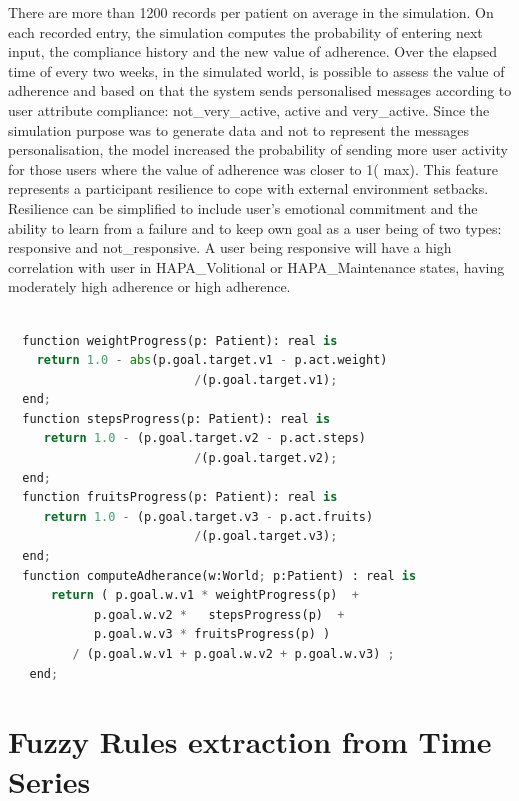 \documentclass[graybox]{svmult}
\begin{document}
There are more than 1200 records per patient on average in the simulation. On each recorded entry, the simulation computes the probability of entering next input, the compliance history and the new value of adherence. Over the elapsed time of every two weeks, in the simulated world,  is possible to assess the value of adherence and based on that the system sends personalised messages according to user attribute compliance: not\_very\_active, active and very\_active. Since the simulation purpose was to generate data and not to represent the messages personalisation, the model increased the probability of sending more user activity for those users where the value of adherence was closer to 1( max).  This feature represents a participant resilience to cope with external environment setbacks. Resilience can be simplified to include user's emotional commitment and the ability to learn from a failure and to keep own goal as a user being of two types: responsive and not\_responsive. A user being responsive will have a high correlation with user in HAPA\_Volitional or HAPA\_Maintenance states, having moderately high adherence or  high adherence.

\begin{lstlisting}[language=Python, caption=Functions used in the Disco specification of Adherence in equation (\ref{Eq.AdheranceFWA})]

  function weightProgress(p: Patient): real is
    return 1.0 - abs(p.goal.target.v1 - p.act.weight)
		                  /(p.goal.target.v1);
  end;
  function stepsProgress(p: Patient): real is
     return 1.0 - (p.goal.target.v2 - p.act.steps)
                          /(p.goal.target.v2);
  end;
  function fruitsProgress(p: Patient): real is
     return 1.0 - (p.goal.target.v3 - p.act.fruits)
                          /(p.goal.target.v3);
  end;
  function computeAdherance(w:World; p:Patient) : real is	 		 
      return ( p.goal.w.v1 * weightProgress(p)  + 
            p.goal.w.v2 *   stepsProgress(p)  +
            p.goal.w.v3 * fruitsProgress(p) )   
         / (p.goal.w.v1 + p.goal.w.v2 + p.goal.w.v3) ;
   end;                    
\end{lstlisting}


\section {Fuzzy Rules extraction from Time Series}
\label{sec.rules}
\end{document}
